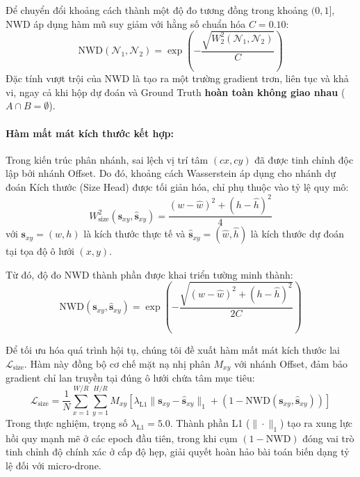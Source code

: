 \documentclass[11pt,a4paper]{article}
\begin{document}
Để chuyển đổi khoảng cách thành một độ đo tương đồng trong khoảng $(0, 1]$, NWD áp dụng hàm mũ suy giảm với hằng số chuẩn hóa $C = 0.10$:
\begin{equation}
    \text{NWD}(\mathcal{N}_1, \mathcal{N}_2) = \exp\left(-\frac{\sqrt{W_2^2(\mathcal{N}_1, \mathcal{N}_2)}}{C}\right)
\end{equation}
Đặc tính vượt trội của NWD là tạo ra một trường gradient trơn, liên tục và khả vi, ngay cả khi hộp dự đoán và Ground Truth \textbf{hoàn toàn không giao nhau} ($A \cap B = \emptyset$).

\paragraph{Hàm mất mát kích thước kết hợp:}
Trong kiến trúc phân nhánh, sai lệch vị trí tâm $(cx, cy)$ đã được tinh chỉnh độc lập bởi nhánh Offset. Do đó, khoảng cách Wasserstein áp dụng cho nhánh dự đoán Kích thước (Size Head) được tối giản hóa, chỉ phụ thuộc vào tỷ lệ quy mô:
\begin{equation}
    W_{\text{size}}^2(\mathbf{s}_{xy}, \hat{\mathbf{s}}_{xy}) = \frac{(w - \hat{w})^2 + (h - \hat{h})^2}{4}
\end{equation}
với $\mathbf{s}_{xy} = (w, h)$ là kích thước thực tế và $\hat{\mathbf{s}}_{xy} = (\hat{w}, \hat{h})$ là kích thước dự đoán tại tọa độ ô lưới $(x, y)$.

Từ đó, độ đo NWD thành phần được khai triển tường minh thành:
\begin{equation}
    \text{NWD}(\mathbf{s}_{xy}, \hat{\mathbf{s}}_{xy}) = \exp\left(-\frac{\sqrt{(w - \hat{w})^2 + (h - \hat{h})^2}}{2C}\right)
\end{equation}

Để tối ưu hóa quá trình hội tụ, chúng tôi đề xuất hàm mất mát kích thước lai $\mathcal{L}_{\text{size}}$. Hàm này đồng bộ cơ chế mặt nạ nhị phân $M_{xy}$ với nhánh Offset, đảm bảo gradient chỉ lan truyền tại đúng ô lưới chứa tâm mục tiêu:
\begin{equation}
    \mathcal{L}_{\text{size}} = \frac{1}{N} \sum_{x=1}^{W/R} \sum_{y=1}^{H/R} M_{xy} \left[ \lambda_{\text{L1}} \|\mathbf{s}_{xy} - \hat{\mathbf{s}}_{xy}\|_1 + \left(1 - \text{NWD}(\mathbf{s}_{xy}, \hat{\mathbf{s}}_{xy})\right) \right]
\end{equation}
Trong thực nghiệm, trọng số $\lambda_{\text{L1}} = 5.0$. Thành phần L1 ($\|\cdot\|_1$) tạo ra xung lực hồi quy mạnh mẽ ở các epoch đầu tiên, trong khi cụm $(1 - \text{NWD})$ đóng vai trò tinh chỉnh độ chính xác ở cấp độ hẹp, giải quyết hoàn hảo bài toán biến dạng tỷ lệ đối với micro-drone.
\end{document}
